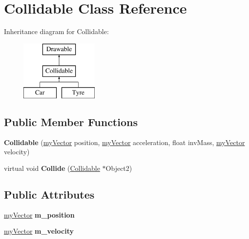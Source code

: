 \hypertarget{class_collidable}{}\section{Collidable Class Reference}
\label{class_collidable}
Inheritance diagram for Collidable\+:\begin{figure}[H]
\begin{center}
\leavevmode
\includegraphics[height=3.000000cm]{class_collidable}
\end{center}
\end{figure}
\subsection*{Public Member Functions}
\begin{DoxyCompactItemize}
\item 
\hypertarget{class_collidable_ad2dd423735fd869f76c55df162d6eff2}{}{\bfseries Collidable} (\hyperlink{classmy_vector}{my\+Vector} position, \hyperlink{classmy_vector}{my\+Vector} acceleration, float inv\+Mass, \hyperlink{classmy_vector}{my\+Vector} velocity)\label{class_collidable_ad2dd423735fd869f76c55df162d6eff2}

\item 
\hypertarget{class_collidable_abfe491d3368cfc9c1407b91b4d5d3d77}{}virtual void {\bfseries Collide} (\hyperlink{class_collidable}{Collidable} $\ast$Object2)\label{class_collidable_abfe491d3368cfc9c1407b91b4d5d3d77}

\end{DoxyCompactItemize}
\subsection*{Public Attributes}
\begin{DoxyCompactItemize}
\item 
\hypertarget{class_collidable_abb12d204a079d68951d396005270c70b}{}\hyperlink{classmy_vector}{my\+Vector} {\bfseries m\+\_\+position}\label{class_collidable_abb12d204a079d68951d396005270c70b}

\item 
\hypertarget{class_collidable_adfeaec03dc9c1c5791b7bc94cff04c44}{}\hyperlink{classmy_vector}{my\+Vector} {\bfseries m\+\_\+velocity}\label{class_collidable_adfeaec03dc9c1c5791b7bc94cff04c44}

\end{DoxyCompactItemize}

